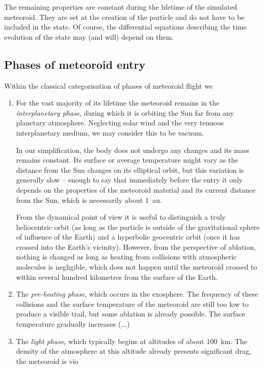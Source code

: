     The remaining properties are constant during the lifetime of the simulated meteoroid.
    They are set at the creation of the particle and do not have to be included in the state.
    Of course, the differential equations describing the time evolution of the state
    may (and will) depend on them.

    \subsection{Phases of meteoroid entry} \label{dap}
        Within the classical categorisation of phases of meteoroid flight \citep{???}
        we 

        \begin{enumerate}
            \item For the vast majority of its lifetime the meteoroid remains in
                the \emph{interplanetary phase}, during which it is orbiting the Sun
                far from any planetary atmosphere. Neglecting solar wind and
                the very tenuous interplanetary medium, we may consider this to be vacuum.

                In our simplification, the body does not undergo any changes and its mass remains constant.
                Its surface or average temperature might vary as the distance from
                the Sun changes on its elliptical orbit, but this variation
                is generally slow -- enough to say that immediately before the entry it only
                depends on the properties of the meteoroid material and its current distance from the Sun,
                which is necessarily about \SI{1}{au}.

                From the dynamical point of view it is useful to distinguish a truly heliocentric orbit
                (as long as the particle is outside of the gravitational sphere of influence of the Earth)
                and a hyperbolic geocentric orbit (once it has crossed into the Earth's vicinity).
                However, from the perspective of ablation, nothing is changed
                as long as heating from collisions with atmospheric molecules is negligible,
                which does not happen until the meteoroid crossed to within several hundred
                kilometres from the surface of the Earth.
            \item The \emph{pre-heating phase}, which occurs in the exosphere. The frequency of these collisions
                and the surface temperature of the meteoroid are still too low to produce a visible
                trail, but some ablation is already possible. The surface temperature
                gradually increases (...)
            \item The \emph{light phase}, which typically begins at altitudes of about \SI{100}{\kilo\metre}.
                The density of the atmosphere at this altitude already presents significant drag,
                the meteoroid is vio


\end{enumerate}

